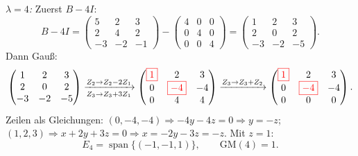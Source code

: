 \documentclass[a4paper,12pt]{article}
\newcommand{\piv}[1]{{\color{red}\boxed{#1}}}
\begin{document}
\textit{$\lambda = 4$:} Zuerst $B - 4I$:
\[
B - 4I = \begin{pmatrix} 5 & 2 & 3 \\ 2 & 4 & 2 \\ -3 & -2 & -1 \end{pmatrix} - \begin{pmatrix} 4 & 0 & 0 \\ 0 & 4 & 0 \\ 0 & 0 & 4 \end{pmatrix} = \begin{pmatrix} 1 & 2 & 3 \\ 2 & 0 & 2 \\ -3 & -2 & -5 \end{pmatrix}.
\]
Dann Gau\ss:
\[
\begin{pmatrix} 1 & 2 & 3 \\ 2 & 0 & 2 \\ -3 & -2 & -5 \end{pmatrix}
\xrightarrow[Z_3 \to Z_3 + 3Z_1]{Z_2 \to Z_2 - 2Z_1}
\begin{pmatrix} \piv{1} & 2 & 3 \\ 0 & \piv{-4} & -4 \\ 0 & 4 & 4 \end{pmatrix}
\xrightarrow{Z_3 \to Z_3 + Z_2}
\begin{pmatrix} \piv{1} & 2 & 3 \\ 0 & \piv{-4} & -4 \\ 0 & 0 & 0 \end{pmatrix}.
\]
Zeilen als Gleichungen: $(0,-4,-4) \Rightarrow -4y - 4z = 0 \Rightarrow y = -z$; \; $(1,2,3) \Rightarrow x + 2y + 3z = 0 \Rightarrow x = -2y - 3z = -z$. Mit $z=1$:
\[
E_4 = \operatorname{span}\{(-1,-1,1)\}, \qquad \text{GM}(4) = 1.
\]
\end{document}
